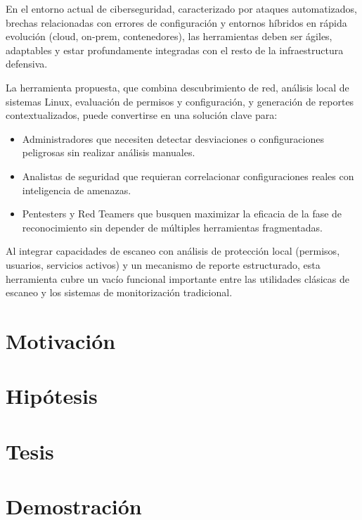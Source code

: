 \documentclass[runningheads]{llncs}
\begin{document}
En el entorno actual de ciberseguridad, caracterizado por ataques automatizados, brechas relacionadas con errores de configuración y entornos híbridos en rápida evolución (cloud, on-prem, contenedores), las herramientas deben ser ágiles, adaptables y estar profundamente integradas con el resto de la infraestructura defensiva.

La herramienta propuesta, que combina descubrimiento de red, análisis local de sistemas Linux, evaluación de permisos y configuración, y generación de reportes contextualizados, puede convertirse en una solución clave para:

\begin{itemize}
    \item Administradores que necesiten detectar desviaciones o configuraciones peligrosas sin realizar análisis manuales.
    \item Analistas de seguridad que requieran correlacionar configuraciones reales con inteligencia de amenazas.
    \item Pentesters y Red Teamers que busquen maximizar la eficacia de la fase de reconocimiento sin depender de múltiples herramientas fragmentadas.
\end{itemize}


Al integrar capacidades de escaneo con análisis de protección local (permisos, usuarios, servicios activos) y un mecanismo de reporte estructurado, esta herramienta cubre un vacío funcional importante entre las utilidades clásicas de escaneo y los sistemas de monitorización tradicional.

\section{Motivación}
\section{Hipótesis}
\section{Tesis}
\section{Demostración}



\end{document}
